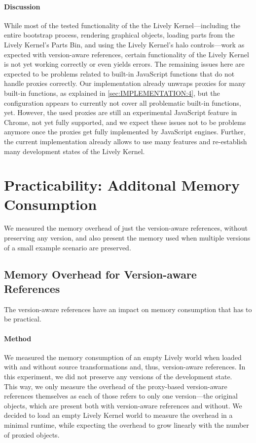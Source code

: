 \paragraph{Discussion}
While most of the tested functionality of the the Lively Kernel---including the entire bootstrap process, rendering graphical objects, loading parts from the Lively Kernel's Parts Bin, and using the Lively Kernel's halo controls---work as expected with version-aware references, certain functionality of the Lively Kernel is not yet working correctly or even yields errors.
The remaining issues here are expected to be problems related to built-in JavaScript functions that do not handle proxies correctly.
Our implementation already unwraps proxies for many built-in functions, as explained in \ref{sec:IMPLEMENTATION:4}, but the configuration appears to currently not cover all problematic built-in functions, yet.
However, the used proxies are still an experimental JavaScript feature in Chrome, not yet fully supported, and we expect these issues not to be problems anymore once the proxies get fully implemented by JavaScript engines.
Further, the current implementation already allows to use many features and re-establish many development states of the Lively Kernel.




\section{Practicability: Additonal Memory Consumption} \label{sec:EVALUATION:3}

We measured the memory overhead of just the version-aware references, without preserving any version, and also present the memory used when multiple versions of a small example scenario are preserved.

\subsection{Memory Overhead for Version-aware References}

The version-aware references have an impact on memory consumption that has to be practical.

\paragraph{Method}
We measured the memory consumption of an empty Lively world when loaded with and without source transformations and, thus, version-aware references.
In this experiment, we did not preserve any versions of the development state.\\
This way, we only measure the overhead of the proxy-based version-aware references themselves as each of those refers to only one version---the original objects, which are present both with version-aware references and without.
We decided to load an empty Lively Kernel world to measure the overhead in a minimal runtime, while expecting the overhead to grow linearly with the number of proxied objects.

